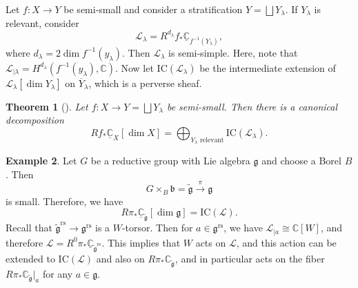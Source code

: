 \documentclass{amsart}
\newtheorem{thm}{Theorem}[section]
\theoremstyle{definition}
\newtheorem{exm}[thm]{Example}
\theoremstyle{remark}
\theoremstyle{plain}
\theoremstyle{definition}
\theoremstyle{remark}
\newcommand{\C}{\mathbb{C}}
\newcommand{\g}{\mathfrak{g}}
\renewcommand{\b}{\mathfrak{b}}
\newcommand{\mc}[1]{\mathcal{#1}}
\newcommand{\mr}[1]{\mathrm{#1}}
\newcommand{\on}[1]{\operatorname{#1}}
\newcommand{\ol}[1]{\overline{#1}}
\newcommand{\ul}[1]{\underline{#1}}
\newcommand{\1}{\mathbf{1}}
\newcommand{\2}{\mathbf{2}}
\newcommand{\3}{\mathbf{3}}
\begin{document}
Let \(f \colon X \to Y\) be semi-small and consider a stratification \(Y = \bigsqcup Y_{\lambda}\). If \(Y_{\lambda}\) is relevant, consider
\[ \mc{L}_{\lambda} = R^{d_{\lambda}} f_* \ul{\C}_{f^{-1}(Y_{\lambda})}, \]
where \(d_{\lambda} = 2 \dim f^{-1} (y_{\lambda})\). Then \(\mc{L}_{\lambda}\) is semi-simple. Here, note that \(\mc{L}_{|\lambda} = H^{d_{\lambda}}(f^{-1}(y_{\lambda}), \C)\). Now let \(\mr{IC}(\mc{L}_{\lambda})\) be the intermediate extension of \(\mc{L}_{\lambda}[\dim Y_{\lambda}]\) on \(\ol{Y}_{\lambda}\), which is a perverse sheaf.

\begin{thm}[{\cite{DeCataldoMigliorini2002}}]
    Let \(f \colon X \to Y = \bigsqcup Y_{\lambda}\) be semi-small. Then there is a canonical decomposition
    \[ R f_* \ul{\C}_X[\dim X] = \bigoplus_{Y_{\lambda}\text{ relevant}} \mr{IC}(\mc{L}_{\lambda}). \]
\end{thm}

\begin{exm}
    Let \(G\) be a reductive group with Lie algebra \(\g\) and choose a Borel \(B\). Then
    \[ G \times_B \b = \tilde{\g} \xrightarrow{\pi} \g \]
    is small. Therefore, we have
    \[ R \pi_* \ul{\C}_{\tilde{\g}} [\dim \g] = \mr{IC}(\mc{L}). \]
    Recall that \(\tilde{\g}^{\on{rs}} \to \g^{\on{rs}}\) is a \(W\)-torsor. Then for \(a \in \g^{\on{rs}}\), we have \(\mc{L}_{|a} \cong \C[W]\), and therefore \(\mc{L} = R^0 \pi_* \ul{\C}_{\tilde{\g}^{\on{rs}}}\). This implies that \(W\) acts on \(\mc{L}\), and this action can be extended to \(\mr{IC}(\mc{L})\) and also on \(R \pi_* \C_{\tilde{\g}}\), and in particular acts on the fiber \(R \pi_* \C_{\tilde{\g}}|_a\) for any \(a \in \g\).
\end{exm}
\end{document}
